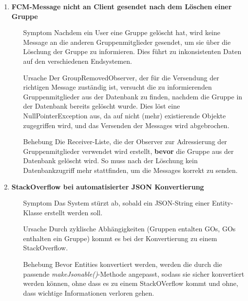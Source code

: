 \documentclass[11pt,a4paper]{scrartcl}
\def\threedigits#1{%
  \ifnum#1<100 0\fi
  \ifnum#1<10 0\fi
  \number#1}
\begin{document}
\begin{enumerate}[label={\textbf{/B\protect\threedigits{\theenumi}0/}}, leftmargin=*]
\item \textbf{FCM-Message nicht an Client gesendet nach dem Löschen einer Gruppe}
	\begin{itemize}
		\item[Symptom]
		Nachdem ein User eine Gruppe gelöscht hat, wird keine Message an die anderen Gruppenmitglieder gesendet, um sie über die Löschung der Gruppe zu informieren. Dies führt zu inkonsistenten Daten auf den verschiedenen Endsystemen.
		\item[Ursache]
		Der GroupRemovedObserver, der für die Versendung der richtigen Message zuständig ist, versucht die zu informierenden Gruppenmitglieder aus der Datenbank zu finden, nachdem die Gruppe in der Datenbank bereits gelöscht wurde. Dies löst eine NullPointerException aus, da auf nicht (mehr) existierende Objekte zugegriffen wird, und das Versenden der Messages wird abgebrochen.
		\item[Behebung]
		Die Receiver-Liste, die der Observer zur Adressierung der Gruppenmitglieder verwendet wird erstellt, \textbf{bevor} die Gruppe aus der Datenbank gelöscht wird. So muss nach der Löschung kein Datenbankzugriff mehr stattfinden, um die Messages korrekt zu senden.
	\end{itemize}

\item \textbf{StackOverflow bei automatisierter JSON Konvertierung}
	\begin{itemize}
		\item[Symptom]
		Das System stürzt ab, sobald ein JSON-String einer Entity-Klasse erstellt werden soll.
		\item[Ursache]
		Durch zyklische Abhängigkeiten (Gruppen entalten GOs, GOs enthalten ein Gruppe) kommt es bei der Konvertierung zu einem StackOverflow.
		\item[Behebung]
		Bevor Entities konvertiert werden, werden die durch die passende \textit{makeJsonable()}-Methode angepasst, sodass sie sicher konvertiert werden können, ohne dass es zu einem StackOVerflow kommt und ohne, dass wichtige Informationen verloren gehen.
	\end{itemize}


\end{enumerate}
\end{document}

